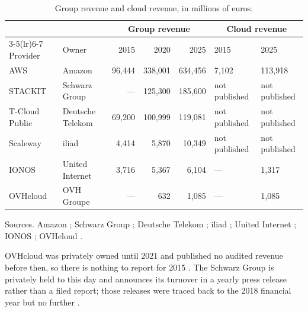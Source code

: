 \begin{table}[htbp]
  \centering
  \caption{Group revenue and cloud revenue, in millions of euros.}
  \label{tab:study3-revenue}
  \footnotesize
  \begin{tabularx}{\textwidth}{@{}l l r r r l l@{}}
    \toprule
    & & \multicolumn{3}{c}{Group revenue} & \multicolumn{2}{c}{Cloud revenue} \\
    \cmidrule(lr){3-5}\cmidrule(lr){6-7}
    Provider & Owner & 2015 & 2020 & 2025 & 2015 & 2025 \\
    \midrule
    \acs{AWS}       & Amazon           & 96{,}444 & 338{,}001 & 634{,}456 & 7{,}102 & 113{,}918 \\
    STACKIT         & Schwarz Group    & ---      & 125{,}300 & 185{,}600 & not published & not published \\
    T-Cloud Public  & Deutsche Telekom & 69{,}200 & 100{,}999 & 119{,}081 & not published & not published \\
    Scaleway        & iliad            & 4{,}414  & 5{,}870   & 10{,}349  & not published & not published \\
    IONOS           & United Internet  & 3{,}716  & 5{,}367   & 6{,}104   & ---           & 1{,}317 \\
    OVHcloud        & OVH Groupe       & ---      & 632       & 1{,}085   & ---           & 1{,}085 \\
    \bottomrule
  \end{tabularx}

  \vspace{2pt}
  \footnotesize
  Sources. Amazon \cite{Amazon_10K_2017,Amazon_10K_2021,Amazon_10K_2025};
  Schwarz Group \cite{Schwarz_Figures_FY2020,Schwarz_Figures_FY2025};
  Deutsche Telekom \cite{DT_Results_2015,DT_AR_2020,DT_AR_2025};
  iliad \cite{Iliad_RegDoc_2016,Iliad_Impact_2025,Iliad_Results_FY2025};
  United Internet \cite{UnitedInternet_AR_2019,UnitedInternet_AR_2020,UnitedInternet_AR_2025};
  IONOS \cite{IONOS_AR_2025};
  OVHcloud \cite{OVHcloud_Results_FY2021,OVHcloud_URD_2025}.
\end{table}

OVHcloud was privately owned until 2021 and published no audited revenue
before then, so there is nothing to report for 2015 \cite{OVHcloud_RegDoc_2021}.
The Schwarz Group is privately held to this day and announces its turnover in a
yearly press release rather than a filed report; those releases were traced back
to the 2018 financial year but no further \cite{Schwarz_Sustainability_2019}.

